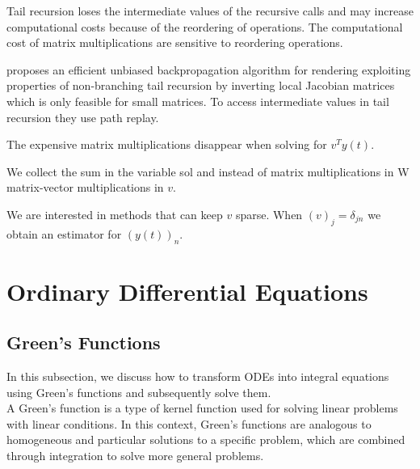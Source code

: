 \documentclass[a4paper,12pt]{article}
\begin{document}
Tail recursion loses the intermediate values
of the recursive calls and
may increase computational costs because of the reordering of operations.
The computational cost of matrix multiplications are sensitive
to reordering operations.

\begin{related}[Non-branching tail recursion]
  \cite{vicini_path_2021} proposes an efficient unbiased backpropagation
  algorithm for rendering exploiting properties of non-branching tail recursion
  by inverting local Jacobian matrices which is only feasible for small matrices.
  To access intermediate values in tail recursion they use path replay.
\end{related}


The expensive matrix multiplications disappear when solving for $v^{T}y(t)$.

\begin{julia} \label{jl:adjoint main poisson}
  We collect the sum in the variable sol and instead of matrix multiplications in W
  matrix-vector multiplications in $v$.


  We are interested in methods that can keep $v$ sparse.
  When $(v)_{j} = \delta_{jn}$ we obtain an estimator for $(y(t))_{n}$.
\end{julia}

\section{Ordinary Differential Equations}

\subsection{Green's Functions}
\label{sec:greens functions}

In this subsection, we discuss how to transform ODEs into integral equations using Green's functions and
subsequently solve them. \\

A Green's function is a type of kernel function used
for solving linear problems with linear conditions. In this context,
Green's functions are analogous to homogeneous and particular solutions
to a specific problem, which are combined through integration to solve
more general problems.
\end{document}
